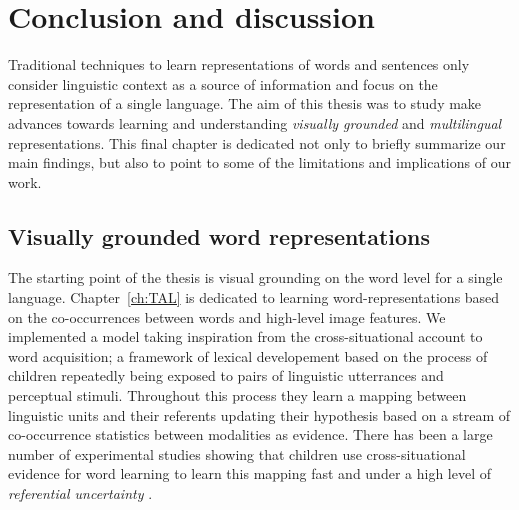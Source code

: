 \chapter{Conclusion and discussion}
\label{ch:conclusion}

Traditional techniques to learn representations of words and sentences only consider 
linguistic context as a source of information and focus on the representation of a single language.
The aim of this thesis was to study make advances towards learning 
and understanding \emph{visually grounded} and \emph{multilingual} representations. 
This final chapter is dedicated not only to briefly summarize our main findings, but also to 
point to some of the limitations and implications of our work.


\section{Visually grounded word representations}
The starting point of the thesis is visual grounding on the word level for a single language.
Chapter~\ref{ch:TAL} is dedicated to learning word-representations based on the co-occurrences between 
words and high-level image features. We implemented a model taking inspiration from
the cross-situational account to word acquisition; a framework of lexical developement
based on the process of children repeatedly being exposed to pairs of linguistic utterrances and 
perceptual stimuli.  Throughout this process they learn a mapping between linguistic 
units and their referents updating their hypothesis based on a stream of co-occurrence statistics
between modalities as evidence. There has been a large number of experimental studies showing
that children use cross-situational evidence for word learning to learn this mapping 
fast \citep{smith.yu.08} and under a high level of \emph{referential uncertainty}
\citep{vouloumanos.werker.09}. 

